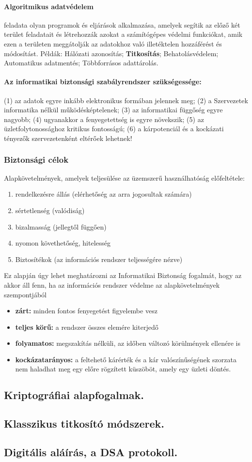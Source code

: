 \paragraph{Algoritmikus adatvédelem} feladata olyan programok és eljárások alkalmazása, amelyek segítik az előző két terület feladatait és létrehozzák azokat a számítógépes védelmi funkciókat, amik ezen a területen meggátolják az adatokhoz való illetéktelen hozzáférést és módosítást. Példák: Hálózati azonosítás; \textbf{Titkosítás}; Behatolásvédelem; Automatikus adatmentés; Többforrásos adattárolás.

\paragraph{Az informatikai biztonsági szabályrendszer szükségessége:} (1) az adatok egyre inkább elektronikus formában jelennek meg; (2) a Szervezetek informatika nélkül működésképtelenek; (3) az informatikai függőség egyre nagyobb; (4) ugyanakkor a fenyegetettség is egyre növekszik; (5) az üzletfolytonossághoz kritikus fontosságú; (6) a kárpotenciál és a kockázati tényezők szervezetenként eltérőek lehetnek!

\subsubsection{Biztonsági célok}
Alapkövetelmények, amelyek teljesülése az üzemszerű használhatóság előfeltétele:
\begin{enumerate}
	\item rendelkezésre állás (elérhetőség az arra jogosultak számára)
	\item sértetlenség (valódiság)
	\item bizalmasság (jellegtől függően)
	\item nyomon követhetőség, hitelesség
	\item Biztosítékok (az információs rendszer teljességére nézve)
\end{enumerate}
Ez alapján úgy lehet meghatározni az Informatikai Biztonság fogalmát, hogy az akkor áll fenn, ha az információs rendszer védelme az alapkövetelmények szempontjából
\begin{itemize}
	\item \textbf{zárt:} minden fontos fenyegetést figyelembe vesz
	\item \textbf{teljes körű:} a rendszer összes elemére kiterjedő
	\item \textbf{folyamatos:} megszakítás nélküli, az időben változó körülmények ellenére is
	\item \textbf{kockázatarányos:} a feltehető kárérték és a kár valószínűségének szorzata nem haladhat meg egy előre rögzített küszöböt, amely egy üzleti döntés.
\end{itemize}

\subsection{Kriptográfiai alapfogalmak.}



\subsection{Klasszikus titkosító módszerek.}


\subsection{Digitális aláírás, a DSA protokoll.}
